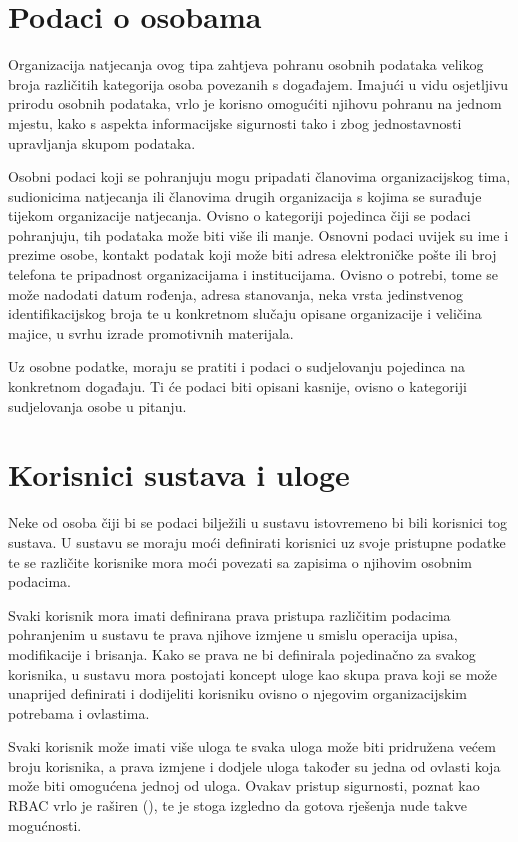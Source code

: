 \documentclass[times, utf8, diplomski]{fer}
\begin{document}
\section{Podaci o osobama}

Organizacija natjecanja ovog tipa zahtjeva pohranu osobnih podataka velikog
broja različitih kategorija osoba povezanih s događajem. Imajući u vidu
osjetljivu prirodu osobnih podataka, vrlo je korisno omogućiti njihovu pohranu
na jednom mjestu, kako s aspekta informacijske sigurnosti tako i zbog
jednostavnosti upravljanja skupom podataka.

Osobni podaci koji se pohranjuju mogu pripadati članovima organizacijskog tima,
sudionicima natjecanja ili članovima drugih organizacija s kojima se surađuje
tijekom organizacije natjecanja. Ovisno o kategoriji pojedinca čiji se podaci
pohranjuju, tih podataka može biti više ili manje. Osnovni podaci uvijek su ime
i prezime osobe, kontakt podatak koji može biti adresa elektroničke pošte ili
broj telefona te pripadnost organizacijama i institucijama. Ovisno o potrebi,
tome se može nadodati datum rođenja, adresa stanovanja, neka vrsta jedinstvenog
identifikacijskog broja te u konkretnom slučaju opisane organizacije i veličina
majice, u svrhu izrade promotivnih materijala.

Uz osobne podatke, moraju se pratiti i podaci o sudjelovanju pojedinca na
konkretnom događaju. Ti će podaci biti opisani kasnije, ovisno o kategoriji
sudjelovanja osobe u pitanju.

\section{Korisnici sustava i uloge}

Neke od osoba čiji bi se podaci bilježili u sustavu istovremeno bi bili
korisnici tog sustava. U sustavu se moraju moći definirati korisnici uz svoje
pristupne podatke te se različite korisnike mora moći povezati sa zapisima o
njihovim osobnim podacima.

Svaki korisnik mora imati definirana prava pristupa različitim podacima
pohranjenim u sustavu te prava njihove izmjene u smislu operacija upisa,
modifikacije i brisanja. Kako se prava ne bi definirala pojedinačno za svakog
korisnika, u sustavu mora postojati koncept uloge kao skupa prava koji se može
unaprijed definirati i dodijeliti korisniku ovisno o njegovim organizacijskim
potrebama i ovlastima.

Svaki korisnik može imati više uloga te svaka uloga može biti pridružena većem
broju korisnika, a prava izmjene i dodjele uloga također su jedna od ovlasti
koja može biti omogućena jednoj od uloga. Ovakav pristup sigurnosti, poznat kao
RBAC  vrlo je raširen (\cite{rbac}), te je stoga
izgledno da gotova rješenja nude takve mogućnosti.
\end{document}
